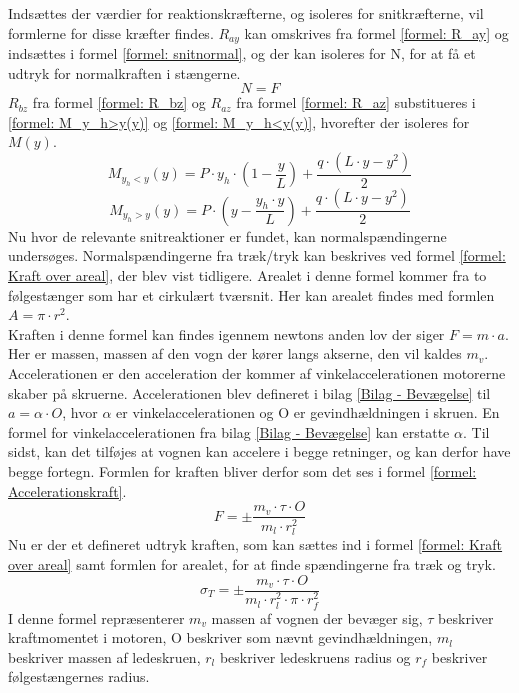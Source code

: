 Indsættes der værdier for reaktionskræfterne, og isoleres for snitkræfterne, vil formlerne for disse kræfter findes.
$R_{ay}$ kan omskrives fra formel \ref{formel: R_ay} og indsættes i formel \ref{formel: snitnormal}, og der kan isoleres for N, for at få et udtryk for normalkraften i stængerne.
\begin{equation}\label{formel: N=F}
    N=F
\end{equation}
$R_{bz}$ fra formel \ref{formel: R_bz} og $R_{az}$ fra formel \ref{formel: R_az} substitueres i \ref{formel: M_y_h>y(y)} og \ref{formel: M_y_h<y(y)}, hvorefter der isoleres for $M(y)$.
\begin{equation}\label{formel: M(y)1}
    M_{y_h<y}(y)= P\cdot y_h\cdot (1-\frac{ y}{L})+\frac {q\cdot( L \cdot y-y^2)}{2}
\end{equation}
\begin{equation} \label{formel: M(y)2}
   M_{y_h>y}(y)=P\cdot  (y-\frac{y_h\cdot y}{L})+ \frac {q\cdot( L \cdot y-y^2)}{2}
\end{equation}
Nu hvor de relevante snitreaktioner er fundet, kan normalspændingerne undersøges. Normalspændingerne fra træk/tryk kan beskrives ved formel \ref{formel: Kraft over areal}, der blev vist tidligere. Arealet i denne formel kommer fra to følgestænger som har et cirkulært tværsnit. Her kan arealet findes med formlen $A=\pi\cdot r^2$.\\
Kraften i denne formel kan findes igennem newtons anden lov der siger $F=m\cdot a$. Her er massen, massen af den vogn der kører langs akserne, den vil kaldes $m_v$. Accelerationen er den acceleration der kommer af vinkelaccelerationen motorerne skaber på skruerne. Accelerationen blev defineret i bilag \ref{Bilag - Bevægelse} til $a=\alpha \cdot O$, hvor $\alpha$ er vinkelaccelerationen og O er gevindhældningen i skruen. En formel for vinkelaccelerationen fra bilag \ref{Bilag - Bevægelse} kan erstatte $\alpha$. Til sidst, kan det tilføjes at vognen kan accelere i begge retninger, og kan derfor have begge fortegn. Formlen for kraften bliver derfor som det ses i formel \ref{formel: Accelerationskraft}.
\begin{equation} \label{formel: Accelerationskraft}
    F=\pm\frac{m_v\cdot \tau\cdot O}{m_l\cdot r_l^2}
\end{equation}
Nu er der et defineret udtryk kraften, som kan sættes ind i formel \ref{formel: Kraft over areal} samt formlen for arealet, for at finde spændingerne fra træk og tryk.
\begin{equation}\label{formel: Træk/tryk spændinger}
    \sigma_T=\pm\frac{m_v\cdot \tau\cdot O}{m_l\cdot r_l^2\cdot \pi \cdot r_f^2}
\end{equation}
I denne formel repræsenterer $m_v$ massen af vognen der bevæger sig, $\tau$ beskriver kraftmomentet i motoren, O beskriver som nævnt gevindhældningen, $m_l$ beskriver massen af ledeskruen, $r_l$ beskriver ledeskruens radius og $r_f$ beskriver følgestængernes radius.\\

